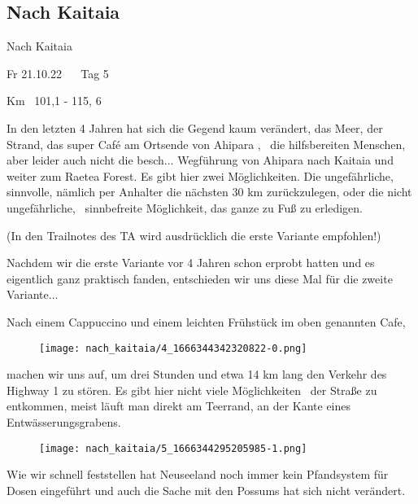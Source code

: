 \subsection{Nach Kaitaia}

Nach Kaitaia


   Fr 21.10.22    Tag 5
  


  Km  101,1 - 115, 6
 


  In den letzten 4 Jahren hat sich die Gegend kaum verändert, das Meer, der Strand, das super Café am Ortsende von Ahipara ,  die hilfsbereiten Menschen, aber leider auch nicht die besch... Wegführung von Ahipara nach Kaitaia und weiter zum Raetea Forest. Es gibt hier zwei Möglichkeiten. Die ungefährliche, sinnvolle, nämlich per Anhalter die nächsten 30 km zurückzulegen, oder die nicht ungefährliche,  sinnbefreite Möglichkeit, das ganze zu Fuß zu erledigen.
 


  (In den Trailnotes des TA wird ausdrücklich die erste Variante empfohlen!)
 


  Nachdem wir die erste Variante vor 4 Jahren schon erprobt hatten und es eigentlich ganz praktisch fanden, entschieden wir uns diese Mal für die zweite Variante...
 


  Nach einem Cappuccino und einem leichten Frühstück im oben genannten Cafe,
 


\begin{figure}[H]
	\centering
	\texttt{[image: nach\_kaitaia/4\_1666344342320822-0.png]}
	\caption{}
	\label{fig:4_1666344342320822-0}
\end{figure}

  machen wir uns auf, um drei Stunden und etwa 14 km lang den Verkehr des Highway 1 zu stören. Es gibt hier nicht viele Möglichkeiten  der Straße zu entkommen, meist läuft man direkt am Teerrand, an der Kante eines Entwässerungsgrabens.
 


\begin{figure}[H]
	\centering
	\texttt{[image: nach\_kaitaia/5\_1666344295205985-1.png]}
	\caption{}
	\label{fig:5_1666344295205985-1}
\end{figure}

  Wie wir schnell feststellen hat Neuseeland noch immer kein Pfandsystem für Dosen eingeführt und auch die Sache mit den Possums hat sich nicht verändert.
 


